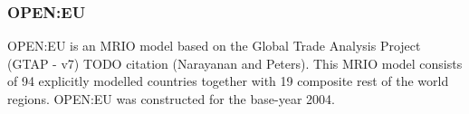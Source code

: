 \subsubsection{OPEN:EU}

OPEN:EU is an MRIO model based on the Global Trade Analysis Project (GTAP - v7)  TODO citation (Narayanan and Peters). 
This MRIO model consists of 94 explicitly modelled countries together with 19 composite rest of the world regions. OPEN:EU was constructed for the base-year 2004.

